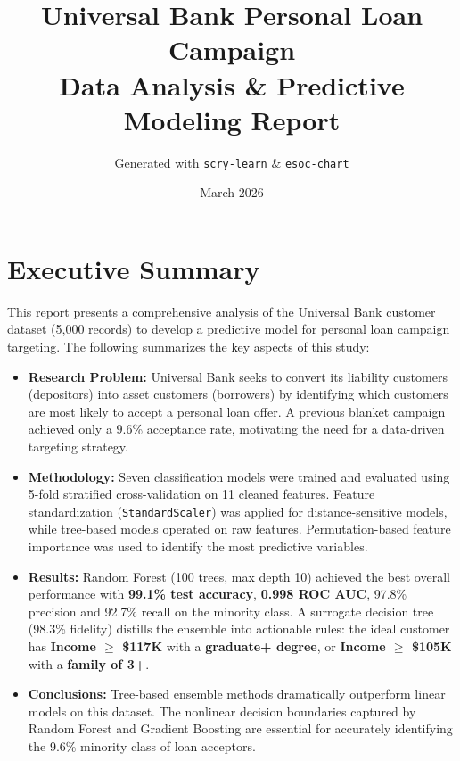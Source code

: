 \documentclass[11pt, a4paper]{article}
\title{
    \vspace{-1cm}
    \textbf{Universal Bank Personal Loan Campaign} \\[0.3em]
    \large Data Analysis \& Predictive Modeling Report
}
\author{Generated with \texttt{scry-learn} \& \texttt{esoc-chart}}
\date{March 2026}
\begin{document}
\maketitle
\thispagestyle{fancy}

\section{Executive Summary}

This report presents a comprehensive analysis of the Universal Bank customer
dataset (5{,}000 records) to develop a predictive model for personal loan
campaign targeting. The following summarizes the key aspects of this study:

\begin{itemize}[leftmargin=*, itemsep=4pt]
    \item \textbf{Research Problem:} Universal Bank seeks to convert its
          liability customers (depositors) into asset customers (borrowers) by
          identifying which customers are most likely to accept a personal loan
          offer. A previous blanket campaign achieved only a 9.6\% acceptance
          rate, motivating the need for a data-driven targeting strategy.

    \item \textbf{Methodology:} Seven classification models were trained and
          evaluated using 5-fold stratified cross-validation on 11 cleaned
          features. Feature standardization (\texttt{StandardScaler}) was applied
          for distance-sensitive models, while tree-based models operated on raw
          features. Permutation-based feature importance was used to identify
          the most predictive variables.

    \item \textbf{Results:} Random Forest (100 trees, max depth 10) achieved
          the best overall performance with \textbf{99.1\% test accuracy},
          \textbf{0.998 ROC AUC}, 97.8\% precision and 92.7\% recall on the
          minority class. A surrogate decision tree (98.3\% fidelity) distills
          the ensemble into actionable rules: the ideal customer has
          \textbf{Income $\geq$ \$117K} with a \textbf{graduate+ degree}, or
          \textbf{Income $\geq$ \$105K} with a \textbf{family of 3+}.

    \item \textbf{Conclusions:} Tree-based ensemble methods dramatically
          outperform linear models on this dataset. The nonlinear decision
          boundaries captured by Random Forest and Gradient Boosting are
          essential for accurately identifying the 9.6\% minority class of
          loan acceptors.


\end{itemize}
\end{document}
